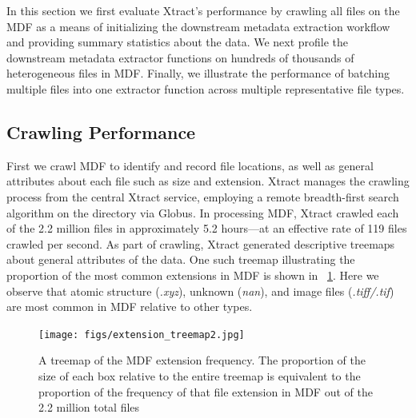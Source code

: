 \documentclass[sigconf]{acmart}
\newcommand{\name}{Xtract}
\begin{document}
In this section we first evaluate \name{}'s performance by crawling all files 
on the MDF as a means of initializing 
the downstream metadata extraction workflow and providing summary statistics about the data. 
We next profile the downstream
metadata extractor functions on hundreds of thousands of heterogeneous files in MDF.  
Finally, we illustrate the performance of batching
multiple files into one extractor function across multiple representative file types. 


\subsection{Crawling Performance}
First we crawl MDF to identify and record file locations, as well as general 
attributes about 
each file such as size and extension.
\name{} manages the crawling process from the central \name{} service, employing a remote breadth-first search 
algorithm on the directory via Globus. %
In processing MDF, \name{} crawled each of the 2.2 million files
in approximately \num{5.2} hours---at an effective rate of \num{119} files crawled per second. 
As part of crawling, \name{} generated descriptive treemaps about general attributes of the data. One such treemap 
illustrating the proportion of the most common extensions in MDF is shown in \figurename{~\ref{fig:treemaps}}. Here 
we observe that atomic structure (\emph{.xyz}), unknown (\emph{nan}), and image files (\emph{.tiff/.tif}) 
are most common in MDF relative to other types.

\begin{figure}
	\texttt{[image: figs/extension\_treemap2.jpg]}
	\caption{A treemap of the MDF extension frequency. The proportion of the size of each box relative to the entire
	treemap is equivalent to the proportion of the frequency of that file extension in MDF out of the 2.2 million total files}
    \label{fig:treemaps}
\end{figure}
\end{document}
